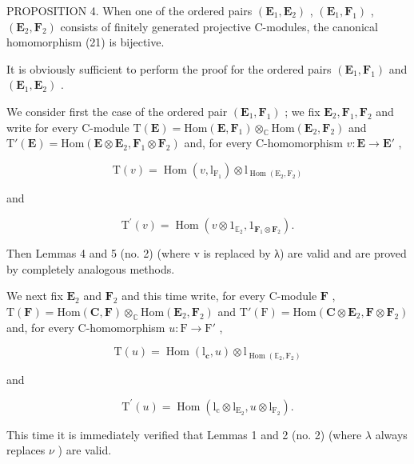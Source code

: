 PROPOSITION 4. When one of the ordered pairs \((\mathbf{E}_1, \mathbf{E}_2)\) , \((\mathbf{E}_1, \mathbf{F}_1)\) , \((\mathbf{E}_2, \mathbf{F}_2)\) consists of finitely generated projective C-modules, the canonical homomorphism (21) is bijective.

It is obviously sufficient to perform the proof for the ordered pairs \((\mathbf{E}_{1}, \mathbf{F}_{1})\) and \((\mathbf{E}_{1}, \mathbf{E}_{2})\) .

We consider first the case of the ordered pair \((\mathbf{E}_1, \mathbf{F}_1)\) ; we fix \(\mathbf{E}_2, \mathbf{F}_1, \mathbf{F}_2\) and write for every C-module \(\mathrm{T}(\mathbf{E}) = \mathrm{Hom}(\mathbf{E}, \mathbf{F}_1) \otimes_{\mathbb{C}} \mathrm{Hom}(\mathbf{E}_2, \mathbf{F}_2)\) and \(\mathrm{T}'(\mathbf{E}) = \mathrm{Hom}(\mathbf{E} \otimes \mathbf{E}_2, \mathbf{F}_1 \otimes \mathbf{F}_2)\) and, for every C-homomorphism \(v: \mathbf{E} \to \mathbf{E}'\) ,

\[
\mathrm{T} (v) = \operatorname{Hom} (v, \mathrm{l} _ {\mathrm{F} _ {1}}) \otimes \mathrm{l} _ {\operatorname{Hom} (\mathrm{E} _ {2}, \mathrm{F} _ {2})}
\]

and

\[
\mathrm{T} ^ {\prime} (v) = \operatorname{Hom} (v \otimes 1 _ {\mathbb {E} _ {2}}, 1 _ {\mathbf {F} _ {1} \otimes \mathbf {F} _ {2}}).
\]

Then Lemmas 4 and 5 (no. 2) (where v is replaced by λ) are valid and are proved by completely analogous methods.

We next fix \(\mathbf{E}_2\) and \(\mathbf{F}_2\) and this time write, for every C-module \(\mathbf{F}\) , \(\mathrm{T}(\mathbf{F}) = \mathrm{Hom}(\mathbf{C},\mathbf{F})\otimes_{\mathbb{C}}\mathrm{Hom}(\mathbf{E}_2,\mathbf{F}_2)\) and \(\mathrm{T}'(\mathrm{F}) = \mathrm{Hom}(\mathbf{C}\otimes \mathbf{E}_2,\mathbf{F}\otimes \mathbf{F}_2)\) and, for every C-homomorphism \(u:\mathrm{F}\to \mathrm{F}'\) ,

\[
\mathrm{T} (u) = \operatorname{Hom} (\mathrm{l} _ {\mathbf {c}}, u) \otimes \mathrm{l} _ {\operatorname{Hom} (\mathbb {E} _ {2}, \mathrm{F} _ {2})}
\]

and

\[
\mathrm{T} ^ {\prime} (u) = \operatorname{Hom} (\mathrm{l} _ {\mathrm{c}} \otimes \mathrm{l} _ {\mathrm{E} _ {2}}, u \otimes \mathrm{l} _ {\mathrm{F} _ {2}}).
\]

This time it is immediately verified that Lemmas 1 and 2 (no. 2) (where \(\lambda\) always replaces \(\nu\) ) are valid.

